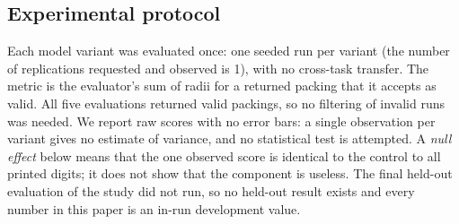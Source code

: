 \documentclass{article} %
\begin{document}
\subsection{Experimental protocol}
Each model variant was evaluated once: one seeded run per variant (the number of replications requested and observed is 1), with no cross-task transfer. The metric is the evaluator's sum of radii for a returned packing that it accepts as valid. All five evaluations returned valid packings, so no filtering of invalid runs was needed. We report raw scores with no error bars: a single observation per variant gives no estimate of variance, and no statistical test is attempted. A \emph{null effect} below means that the one observed score is identical to the control to all printed digits; it does not show that the component is useless. The final held-out evaluation of the study did not run, so no held-out result exists and every number in this paper is an in-run development value.
\end{document}
